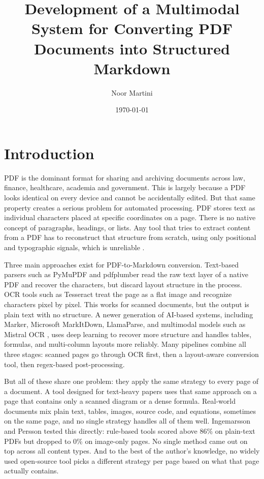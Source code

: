 \documentclass[12pt]{article}
\title{Development of a Multimodal System for Converting PDF Documents into Structured Markdown}
\author{Noor Martini}
\date{\today}
\begin{document}
\maketitle
\tableofcontents
\newpage

\section{Introduction}

PDF is the dominant format for sharing and archiving documents across law,
finance, healthcare, academia and government. This is largely because a PDF
looks identical on every device and cannot be accidentally edited. But that
same property creates a serious problem for automated processing. PDF stores
text as individual characters placed at specific coordinates on a page. There
is no native concept of paragraphs, headings, or lists. Any tool that tries to extract content from
a PDF has to reconstruct that structure from scratch, using only positional
and typographic signals, which is unreliable \cite{whitington2012}.

Three main approaches exist for PDF-to-Markdown conversion. Text-based parsers
such as PyMuPDF and pdfplumber \cite{meuschke2023} read the raw text layer of
a native PDF and recover the characters, but discard layout structure in the
process. OCR tools such as Tesseract \cite{smith2007} treat the page as a flat
image and recognize characters pixel by pixel. This works for scanned documents,
but the output is plain text with no structure. A newer generation of
AI-based systems, including Marker, Microsoft MarkItDown, LlamaParse, and
multimodal models such as Mistral OCR \cite{omnidocbench2025}, uses deep learning
to recover more structure and handles tables, formulas, and multi-column layouts
more reliably. Many pipelines combine all three stages: scanned pages go through
OCR first, then a layout-aware conversion tool, then regex-based post-processing.

But all of these share one problem: they apply the same strategy to every page
of a document. A tool designed for text-heavy papers uses that same approach on
a page that contains only a scanned diagram or a dense formula. Real-world
documents mix plain text, tables, images, source code, and equations, sometimes
on the same page, and no single strategy handles all of them well. Ingemarsson
and Persson \cite{ingemarsson2024} tested this directly: rule-based tools scored
above 86\% on plain-text PDFs but dropped to 0\% on image-only pages. No single
method came out on top across all content types. And to the best of the author's
knowledge, no widely used open-source tool picks a different strategy per page
based on what that page actually contains.
\end{document}
